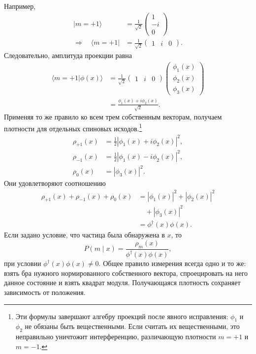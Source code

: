 Например,
\begin{equation}
\begin{aligned}
|m=+1\rangle
&=
\frac{1}{\sqrt2}
\begin{pmatrix}
1\\
-i\\
0
\end{pmatrix}
\\
\Longrightarrow\quad\langle m=+1|
&=
\frac{1}{\sqrt2}
\begin{pmatrix}
1&i&0
\end{pmatrix}.
\end{aligned}
\end{equation}
Следовательно, амплитуда проекции равна
\begin{align}
\langle m=+1|\phi(x)\rangle
&=
\frac{1}{\sqrt2}
\begin{pmatrix}
1&i&0
\end{pmatrix}
\begin{pmatrix}
\phi_1(x)\\
\phi_2(x)\\
\phi_3(x)
\end{pmatrix}\\
&=
\frac{\phi_1(x)+i\phi_2(x)}{\sqrt2}.
\end{align}
Применяя то же правило ко всем трем собственным векторам, получаем плотности для отдельных спиновых исходов.\footnote{Эти формулы завершают алгебру проекций после явного исправления: \(\phi_1\) и \(\phi_2\) не обязаны быть вещественными. Если считать их вещественными, это неправильно уничтожит интерференцию, различающую плотности \(m=+1\) и \(m=-1\).}
\begin{align}
\rho_{+1}(x)
&=
\frac12\left|\phi_1(x)+i\phi_2(x)\right|^2,\\
\rho_{-1}(x)
&=
\frac12\left|\phi_1(x)-i\phi_2(x)\right|^2,\\
\rho_0(x)
&=
|\phi_3(x)|^2.
\end{align}
Они удовлетворяют соотношению
\begin{equation}
\begin{aligned}
\rho_{+1}(x)+\rho_{-1}(x)+\rho_0(x)
&=
|\phi_1(x)|^2+|\phi_2(x)|^2
\\
&\quad{}+|\phi_3(x)|^2
\\
&=
\phi^\dagger(x)\phi(x).
\end{aligned}
\end{equation}
Если задано условие, что частица была обнаружена в \(x\), то
\begin{equation}
P(m\mid x)
=
\frac{\rho_m(x)}{\phi^\dagger(x)\phi(x)},
\end{equation}
при условии \(\phi^\dagger(x)\phi(x)\neq0\). Общее правило измерения всегда одно и то же: взять бра нужного нормированного собственного вектора, спроецировать на него данное состояние и взять квадрат модуля. Получающаяся плотность сохраняет зависимость от положения.

